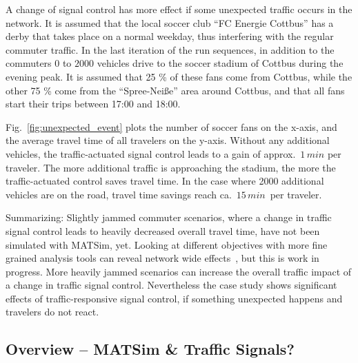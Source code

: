 A change of signal control has more effect if some unexpected traffic occurs in the network. 
It is assumed that the local soccer club ``FC Energie Cottbus'' has a derby that takes place on a normal weekday, thus interfering with the regular commuter traffic. 
In the last iteration of the run sequences, in addition to the commuters $0$ to $2000$ vehicles drive to the soccer stadium of Cottbus during the evening peak. 
It is assumed that 25 \% of these fans come from Cottbus,
while the other 75 \% come from the ``Spree-Nei{\ss}e'' area around Cottbus, and that all fans start their trips between 17:00 and 18:00. 

Fig.~\ref{fig:unexpected_event} plots the number of soccer fans on
the x-axis, and the average travel time of all travelers on the
y-axis. Without any additional vehicles,
the traffic-actuated signal control leads to a gain of
approx.~$1 \, min$ per traveler.
The more additional traffic is approaching the stadium, the more the traffic-actuated control saves travel time. In the case where 2000 additional vehicles are on the road, travel time savings reach ca.~$15\, min$~per traveler. 

Summarizing: Slightly jammed commuter scenarios, where a change in traffic signal control leads to heavily decreased overall travel time, have not been simulated with MATSim, yet. 
Looking at different objectives with more fine grained analysis tools can reveal network wide effects~\citep[e.g.~see the analysis using macroscopic fundamental diagrams, pp.114]{Grether2014PhD}, but this is work in progress.  
More heavily jammed scenarios can increase the overall traffic impact of a change in traffic signal control. Nevertheless the case study shows significant effects of traffic-responsive signal control, if something unexpected happens and travelers do not react.  

\subsection{Overview -- MATSim \& Traffic Signals?}

